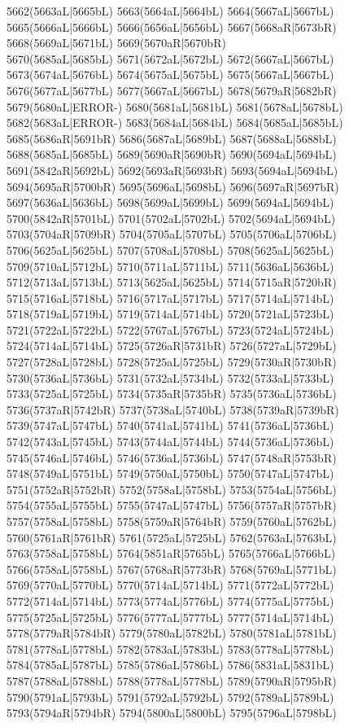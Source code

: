 5662(5663aL|5665bL) 5663(5664aL|5664bL) 5664(5667aL|5667bL) 5665(5666aL|5666bL) 5666(5656aL|5656bL) 5667(5668aR|5673bR) 5668(5669aL|5671bL) 5669(5670aR|5670bR) \\5670(5685aL|5685bL) 5671(5672aL|5672bL) 5672(5667aL|5667bL) 5673(5674aL|5676bL) 5674(5675aL|5675bL) 5675(5667aL|5667bL) 5676(5677aL|5677bL) 5677(5667aL|5667bL) 5678(5679aR|5682bR) \\5679(5680aL|ERROR-) 5680(5681aL|5681bL) 5681(5678aL|5678bL) 5682(5683aL|ERROR-) 5683(5684aL|5684bL) 5684(5685aL|5685bL) 5685(5686aR|5691bR) 5686(5687aL|5689bL) 5687(5688aL|5688bL) \\5688(5685aL|5685bL) 5689(5690aR|5690bR) 5690(5694aL|5694bL) 5691(5842aR|5692bL) 5692(5693aR|5693bR) 5693(5694aL|5694bL) 5694(5695aR|5700bR) 5695(5696aL|5698bL) 5696(5697aR|5697bR) \\5697(5636aL|5636bL) 5698(5699aL|5699bL) 5699(5694aL|5694bL) 5700(5842aR|5701bL) 5701(5702aL|5702bL) 5702(5694aL|5694bL) 5703(5704aR|5709bR) 5704(5705aL|5707bL) 5705(5706aL|5706bL) \\5706(5625aL|5625bL) 5707(5708aL|5708bL) 5708(5625aL|5625bL) 5709(5710aL|5712bL) 5710(5711aL|5711bL) 5711(5636aL|5636bL) 5712(5713aL|5713bL) 5713(5625aL|5625bL) 5714(5715aR|5720bR) \\5715(5716aL|5718bL) 5716(5717aL|5717bL) 5717(5714aL|5714bL) 5718(5719aL|5719bL) 5719(5714aL|5714bL) 5720(5721aL|5723bL) 5721(5722aL|5722bL) 5722(5767aL|5767bL) 5723(5724aL|5724bL) \\5724(5714aL|5714bL) 5725(5726aR|5731bR) 5726(5727aL|5729bL) 5727(5728aL|5728bL) 5728(5725aL|5725bL) 5729(5730aR|5730bR) 5730(5736aL|5736bL) 5731(5732aL|5734bL) 5732(5733aL|5733bL) \\5733(5725aL|5725bL) 5734(5735aR|5735bR) 5735(5736aL|5736bL) 5736(5737aR|5742bR) 5737(5738aL|5740bL) 5738(5739aR|5739bR) 5739(5747aL|5747bL) 5740(5741aL|5741bL) 5741(5736aL|5736bL) \\5742(5743aL|5745bL) 5743(5744aL|5744bL) 5744(5736aL|5736bL) 5745(5746aL|5746bL) 5746(5736aL|5736bL) 5747(5748aR|5753bR) 5748(5749aL|5751bL) 5749(5750aL|5750bL) 5750(5747aL|5747bL) \\5751(5752aR|5752bR) 5752(5758aL|5758bL) 5753(5754aL|5756bL) 5754(5755aL|5755bL) 5755(5747aL|5747bL) 5756(5757aR|5757bR) 5757(5758aL|5758bL) 5758(5759aR|5764bR) 5759(5760aL|5762bL) \\5760(5761aR|5761bR) 5761(5725aL|5725bL) 5762(5763aL|5763bL) 5763(5758aL|5758bL) 5764(5851aR|5765bL) 5765(5766aL|5766bL) 5766(5758aL|5758bL) 5767(5768aR|5773bR) 5768(5769aL|5771bL) \\5769(5770aL|5770bL) 5770(5714aL|5714bL) 5771(5772aL|5772bL) 5772(5714aL|5714bL) 5773(5774aL|5776bL) 5774(5775aL|5775bL) 5775(5725aL|5725bL) 5776(5777aL|5777bL) 5777(5714aL|5714bL) \\5778(5779aR|5784bR) 5779(5780aL|5782bL) 5780(5781aL|5781bL) 5781(5778aL|5778bL) 5782(5783aL|5783bL) 5783(5778aL|5778bL) 5784(5785aL|5787bL) 5785(5786aL|5786bL) 5786(5831aL|5831bL) \\5787(5788aL|5788bL) 5788(5778aL|5778bL) 5789(5790aR|5795bR) 5790(5791aL|5793bL) 5791(5792aL|5792bL) 5792(5789aL|5789bL) 5793(5794aR|5794bR) 5794(5800aL|5800bL) 5795(5796aL|5798bL) 
